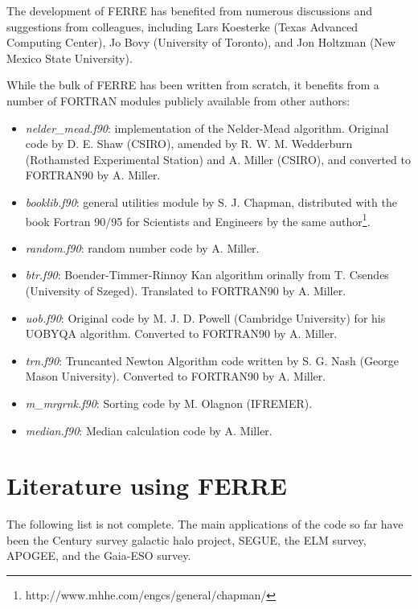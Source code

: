\documentclass[12pt]{article}
\begin{document}
The development of FERRE has benefited from numerous discussions and suggestions
from colleagues, including 
Lars Koesterke (Texas Advanced Computing Center), Jo Bovy (University of Toronto), and
Jon Holtzman (New Mexico State University).

While the bulk of FERRE has been written from scratch, it benefits from a number of FORTRAN
modules publicly available from other authors:

\begin{itemize}
\item {\it nelder\_mead.f90}: implementation of the Nelder-Mead algorithm. 
Original code by D. E. Shaw (CSIRO), amended by R. W. M. Wedderburn
 (Rothamsted Experimental Station) and A. Miller (CSIRO), and converted to FORTRAN90 by
 A. Miller.

\item {\it booklib.f90}: general utilities module by S. J. Chapman, distributed with the book 
Fortran 90/95 for Scientists and Engineers by the same author\footnote{http://www.mhhe.com/engcs/general/chapman/}.

\item {\it random.f90}: random number code by A. Miller.

\item {\it btr.f90}: Boender-Timmer-Rinnoy Kan algorithm orinally from T. Csendes (University of Szeged).
Translated to FORTRAN90 by A. Miller.

\item {\it uob.f90}: Original code by M. J. D. Powell (Cambridge University) for his UOBYQA algorithm. 
Converted to FORTRAN90 by A. Miller.

\item {\it trn.f90}: Truncanted Newton Algorithm code written by S. G. Nash (George Mason University).
Converted to FORTRAN90 by A. Miller.

\item {\it m\_mrgrnk.f90}: Sorting code by M. Olagnon (IFREMER).

\item {\it median.f90}: Median calculation code by A. Miller.
\end{itemize}

\section{Literature using FERRE}
\label{literature}

The following list is not complete. The main applications of the code so far 
have been the Century survey galactic halo project, SEGUE, the ELM survey, 
APOGEE, and the Gaia-ESO survey.
\end{document}

